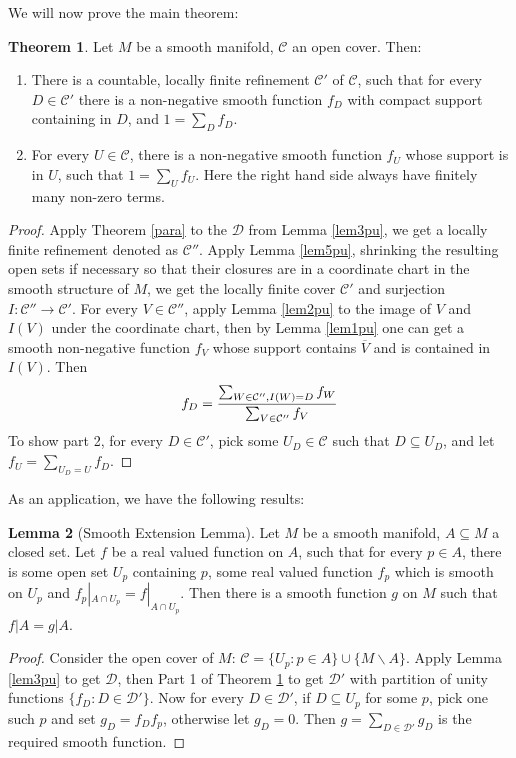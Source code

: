 \documentclass{article}
\theoremstyle{definition}
\newtheorem{thm}{Theorem}[section]
\newtheorem{lem}[thm]{Lemma}
\begin{document}
We will now prove the main theorem:

\begin{thm}\label{pu}
Let $M$ be a smooth manifold, $\mathcal{C}$ an open cover. Then:
\begin{enumerate}
    \item There is a countable, locally finite refinement $\mathcal{C}'$ of $\mathcal{C}$, such that for every $D\in \mathcal{C}'$ there is a non-negative smooth function $f_D$ with compact support containing in $D$, and $1=\sum_D f_D$.
    \item For every $U\in\mathcal{C}$, there is a non-negative smooth function $f_U$ whose support is in $U$, such that $1=\sum_U f_U$. Here the right hand side always have finitely many non-zero terms.
\end{enumerate}
\end{thm}


\begin{proof}
    Apply Theorem \ref{para} to the $\mathcal{D}$ from Lemma \ref{lem3pu}, we get a locally finite refinement denoted as $\mathcal{C}''$. Apply Lemma \ref{lem5pu}, shrinking the resulting open sets if necessary so that their closures are in a coordinate chart in the smooth structure of $M$, we get the locally finite cover $\mathcal{C}'$ and surjection $I: \mathcal{C}''\rightarrow \mathcal{C}'$. For every $V\in\mathcal{C}''$, apply Lemma \ref{lem2pu} to the image of $V$ and $I(V)$ under the coordinate chart, then by Lemma \ref{lem1pu} one can get a smooth non-negative function $f_V$ whose support contains $\overline{V}$ and is contained in $I(V)$. Then 
    \[f_D={\sum_{W\in\mathcal{C}'', I(W)=D}f_W\over\sum_{V\in\mathcal{C}''}f_V}\]
    To show part 2, for every $D\in\mathcal{C}'$, pick some $U_D\in \mathcal{C}$ such that $D\subseteq U_D$, and let $f_U=\sum_{U_D=U}f_D$. 
\end{proof}

As an application, we have the following results:

\begin{lem}[Smooth Extension Lemma]\label{extend}
Let $M$ be a smooth manifold, $A\subseteq M$ a closed set. Let $f$ be a real valued function on $A$, such that for every $p\in A$, there is some open set $U_p$ containing $p$, some real valued function $f_p$ which is smooth on $U_p$ and $f_p|_{A\cap U_p}=f|_{A\cap U_p}$. Then there is a smooth function $g$ on $M$ such that $f|A=g|A$. 
\end{lem}

\begin{proof}
Consider the open cover of $M$: $\mathcal{C}=\{U_p: p\in A\}\cup\{M\backslash A\}$. Apply Lemma \ref{lem3pu} to get $\mathcal{D}$, then Part 1 of Theorem \ref{pu} to get $\mathcal{D}'$ with partition of unity functions $\{f_D: D\in\mathcal{D}'\}$. Now for every $D\in\mathcal{D}'$, if $D\subseteq U_p$ for some $p$, pick one such $p$ and set $g_D=f_Df_p$, otherwise let $g_D=0$. Then $g=\sum_{D\in\mathcal{D}'}g_D$ is the required smooth function.
\end{proof}
\end{document}

